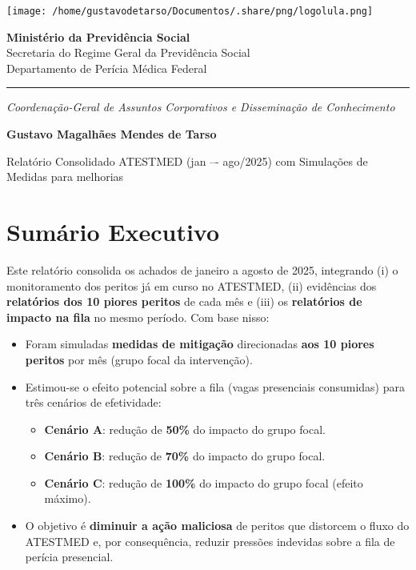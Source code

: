 \documentclass[11pt]{article}
\author{Gustavo M. Mendes de Tarso}
\date{\today}
\title{}
\begin{document}
\begin{center}
\texttt{[image: /home/gustavodetarso/Documentos/.share/png/logolula.png]}
\end{center}

\vspace{-1.8cm}
\begin{center}
\textbf{Ministério da Previdência Social}\\
Secretaria do Regime Geral da Previdência Social\\
Departamento de Perícia Médica Federal
\end{center}

\vspace{-0.3cm}
\hrule

\vspace{-0.3cm}
\begin{center}
\textit{Coordenação-Geral de Assuntos Corporativos e Disseminação de Conhecimento}
\end{center}

\vspace{-0.8cm}
\begin{center}
\textbf{Gustavo Magalhães Mendes de Tarso}
\end{center}

\vspace{0.5cm}

\begin{center}
Relatório Consolidado ATESTMED (jan –- ago/2025) com Simulações de Medidas para melhorias
\end{center}

\section{Sumário Executivo}
\label{sec:orgec2fc97}
Este relatório consolida os achados de janeiro a agosto de 2025, integrando (i) o monitoramento dos peritos já em curso no ATESTMED, (ii) evidências dos \textbf{relatórios dos 10 piores peritos} de cada mês e (iii) os \textbf{relatórios de impacto na fila} no mesmo período. Com base nisso:
\begin{itemize}
\item Foram simuladas \textbf{medidas de mitigação} direcionadas \textbf{\textbf{aos 10 piores peritos}} por mês (grupo focal da intervenção).
\item Estimou-se o efeito potencial sobre a fila (vagas presenciais consumidas) para três cenários de efetividade:
\begin{itemize}
\item \textbf{Cenário A}: redução de \textbf{\textbf{50\%}} do impacto do grupo focal.
\item \textbf{Cenário B}: redução de \textbf{\textbf{70\%}} do impacto do grupo focal.
\item \textbf{Cenário C}: redução de \textbf{\textbf{100\%}} do impacto do grupo focal (efeito máximo).
\end{itemize}
\item O objetivo é \textbf{diminuir a ação maliciosa} de peritos que distorcem o fluxo do ATESTMED e, por consequência, reduzir pressões indevidas sobre a fila de perícia presencial.
\end{itemize}
\end{document}
